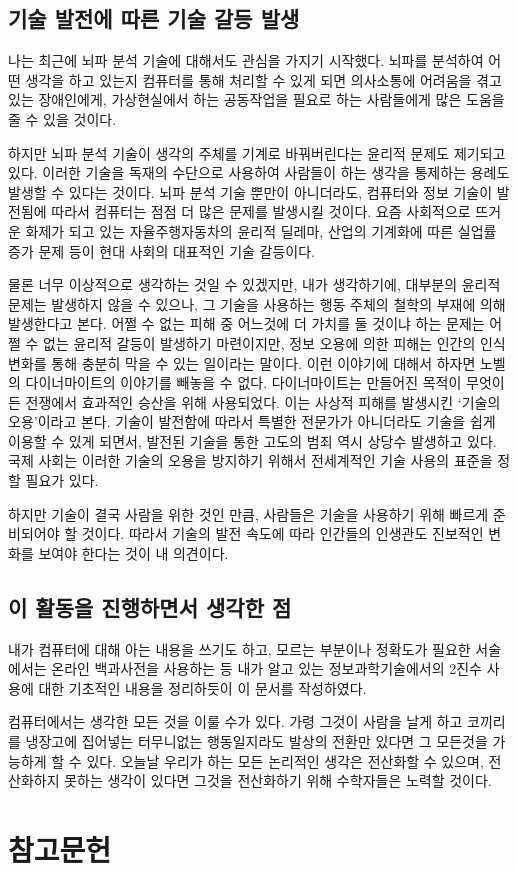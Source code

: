 \documentclass{article}
\begin{document}
\subsection{기술 발전에 따른 기술 갈등 발생}

나는 최근에 뇌파 분석 기술에 대해서도 관심을 가지기 시작했다.
뇌파를 분석하여 어떤 생각을 하고 있는지 컴퓨터를 통해 처리할 수 있게 되면
의사소통에 어려움을 겪고 있는 장애인에게, 가상현실에서 하는 공동작업을 필요로 하는 사람들에게
많은 도움을 줄 수 있을 것이다.

하지만 뇌파 분석 기술이 생각의 주체를 기계로 바꿔버린다는 윤리적 문제도 제기되고 있다.
이러한 기술을 독재의 수단으로 사용하여 사람들이 하는 생각을 통제하는 용례도 발생할 수 있다는 것이다.
뇌파 분석 기술 뿐만이 아니더라도, 컴퓨터와 정보 기술이 발전됨에 따라서 컴퓨터는 점점
더 많은 문제를 발생시킬 것이다.
요즘 사회적으로 뜨거운 화제가 되고 있는 자율주행자동차의 윤리적 딜레마,
산업의 기계화에 따른 실업률 증가 문제 등이 현대 사회의 대표적인 기술 갈등이다.

물론 너무 이상적으로 생각하는 것일 수 있겠지만, 내가 생각하기에, 대부분의 윤리적 문제는 발생하지
않을 수 있으나, 그 기술을 사용하는 행동 주체의 철학의 부재에 의해 발생한다고 본다.
어쩔 수 없는 피해 중 어느것에 더 가치를 둘 것이냐 하는 문제는 어쩔 수 없는 윤리적 갈등이 발생하기
마련이지만, 정보 오용에 의한 피해는 인간의 인식 변화를 통해 충분히 막을 수 있는 일이라는 말이다.
이런 이야기에 대해서 하자면 노벨의 다이너마이트의 이야기를 빼놓을 수 없다.
다이너마이트는 만들어진 목적이 무엇이든 전쟁에서 효과적인 승산을 위해 사용되었다. 이는 사상적 피해를
발생시킨 `기술의 오용'이라고 본다.
기술이 발전함에 따라서 특별한 전문가가 아니더라도 기술을 쉽게 이용할 수 있게 되면서,
발전된 기술을 통한 고도의 범죄 역시 상당수 발생하고 있다.
국제 사회는 이러한 기술의 오용을 방지하기 위해서 전세계적인 기술 사용의 표준을 정할 필요가 있다.

하지만 기술이 결국 사람을 위한 것인 만큼, 사람들은 기술을 사용하기 위해 빠르게 준비되어야 할 것이다.
따라서 기술의 발전 속도에 따라 인간들의 인생관도 진보적인 변화를 보여야 한다는 것이 내 의견이다.

\subsection{이 활동을 진행하면서 생각한 점}

내가 컴퓨터에 대해 아는 내용을 쓰기도 하고, 모르는 부분이나 정확도가 필요한 서술에서는
온라인 백과사전을 사용하는 등 내가 알고 있는 정보과학기술에서의 2진수 사용에 대한 기초적인 내용을
정리하듯이 이 문서를 작성하였다.

컴퓨터에서는 생각한 모든 것을 이룰 수가 있다. 가령 그것이 사람을 날게 하고 코끼리를 냉장고에
집어넣는 터무니없는 행동일지라도 발상의 전환만 있다면 그 모든것을 가능하게 할 수 있다.
오늘날 우리가 하는 모든 논리적인 생각은 전산화할 수 있으며, 전산화하지 못하는 생각이 있다면
그것을 전산화하기 위해 수학자들은 노력할 것이다.

\section{참고문헌}
\end{document}
